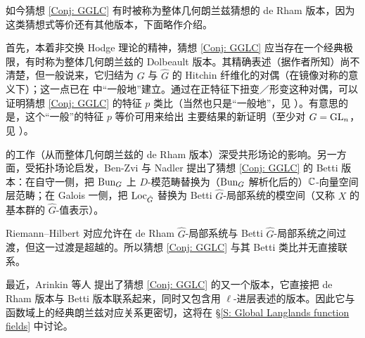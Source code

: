 如今猜想 \ref{Conj: GGLC} 有时被称为整体几何朗兰兹猜想的 de Rham 版本，因为这类猜想式等价还有其他版本，下面略作介绍。

首先，本着非交换 Hodge 理论的精神，猜想 \ref{Conj: GGLC} 应当存在一个经典极限，有时称为整体几何朗兰兹的 Dolbeault 版本。其精确表述（据作者所知）尚不清楚，但一般说来，它归结为 $G$ 与 $\hat{G}$ 的 Hitchin 纤维化的对偶（在镜像对称的意义下）；这一点已在 \cite{Donagi-Pantev-Hitchin, Chen-Zhu-Geometric-Langlands-char-p} 中“一般地”建立。通过在正特征下扭变／形变这种对偶，可以证明猜想 \ref{Conj: GGLC} 的特征 $p$ 类比（当然也只是“一般地”，见 \cite{Bezrukavnikov-Braverman-Geometric-Langlands-char-p, Chen-Zhu-Nonabelian-Hodge, Chen-Zhu-Geometric-Langlands-char-p}）。有意思的是，这个“一般”的特征 $p$ 等价可用来给出 \cite{Beilinson-Drinfeld-Hitchin} 主要结果的新证明（至少对 $G={\operatorname{GL}}_n$，见 \cite{Bezrukavnikov-Travkin-Quantization}）。

\cite{Beilinson-Drinfeld-Hitchin} 的工作（从而整体几何朗兰兹的 de Rham 版本）深受共形场论的影响。另一方面，受拓扑场论启发，Ben-Zvi 与 Nadler \cite{Ben-Zvi-Nadler-Betti-Geometric-Langlands} 提出了猜想 \ref{Conj: GGLC} 的 Betti 版本：在自守一侧，把 ${\operatorname{Bun}}_G$ 上 $D$-模范畴替换为（${\operatorname{Bun}}_G$ 解析化后的）${\mathbb C}$-向量空间层范畴；在 Galois 一侧，把 ${\operatorname{Loc}}_{\hat{G}}$ 替换为 Betti $\hat{G}$-局部系统的模空间（又称 $X$ 的基本群的 $\hat{G}$-值表示）。

Riemann--Hilbert 对应允许在 de Rham $\hat{G}$-局部系统与 Betti $\hat{G}$-局部系统之间过渡，但这一过渡是超越的。所以猜想 \ref{Conj: GGLC} 与其 Betti 类比并无直接联系。

最近，Arinkin 等人 \cite{AGKRRV} 提出了猜想 \ref{Conj: GGLC} 的又一个版本，它直接把 de Rham 版本与 Betti 版本联系起来，同时又包含用 $\ell$-进层表述的版本。因此它与函数域上的经典朗兰兹对应关系更密切，这将在 \S\ref{S: Global Langlands function fields} 中讨论。
